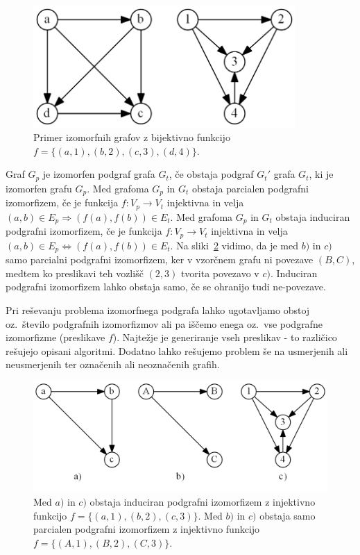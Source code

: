 \documentclass[a4paper, 12pt, ]{book}
\begin{document}
	\begin{figure}
	\begin{center}
	\includegraphics[width=10cm]{img/graph_izomorph.png}
	\end{center}
	\caption{Primer izomorfnih grafov z bijektivno funkcijo $f = \{(a, 1), (b, 2), (c, 3), (d, 4)\}$.}
	\label{pic_iso}
	\end{figure}


	Graf $G_p$ je izomorfen podgraf grafa $G_t$, če obstaja podgraf $G_t'$ grafa $G_t$, ki je izomorfen grafu $G_p$.
	Med grafoma $G_p$ in $G_t$ obstaja parcialen podgrafni izomorfizem, če je funkcija $f: V_p \to V_t$ injektivna in velja
	$(a,b) \in E_p \Rightarrow (f(a), f(b)) \in E_t$.
	Med grafoma $G_p$ in $G_t$ obstaja induciran podgrafni izomorfizem, če je funkcija $f: V_p \to V_t$ injektivna in velja
	$(a,b) \in E_p \Leftrightarrow (f(a), f(b)) \in E_t$. Na sliki~\ref{pic_sub_iso} vidimo, da je med $b)$ in $c)$ samo parcialni podgrafni
	izomorfizem, ker v vzorčnem grafu ni povezave $(B, C)$, medtem ko preslikavi teh vozlišč $(2, 3)$ tvorita povezavo v $c)$. Induciran 
	podgrafni izomorfizem lahko obstaja samo, če se ohranijo tudi ne-povezave.
	
	Pri reševanju problema izomorfnega podgrafa lahko ugotavljamo obstoj oz.~število podgrafnih izomorfizmov ali pa iščemo enega oz.~vse
	podgrafne izomorfizme (preslikave $f$). Najtežje je generiranje vseh preslikav - to različico rešujejo opisani algoritmi. Dodatno lahko rešujemo
	problem še na usmerjenih ali neusmerjenih ter označenih ali neoznačenih grafih.


	\begin{figure}
	\begin{center}
	\includegraphics[width=15cm]{img/graph_sub_izomorph.png}
	\end{center}
	\caption{Med $a)$ in $c)$ obstaja induciran podgrafni izomorfizem z injektivno funkcijo $f = \{(a, 1), (b, 2), (c, 3)\}$. Med $b)$ in $c)$ obstaja
	samo parcialen podgrafni izomorfizem z injektivno funkcijo $f = \{(A, 1), (B, 2), (C, 3)\}$.}
	\label{pic_sub_iso}
	\end{figure}
\end{document}
